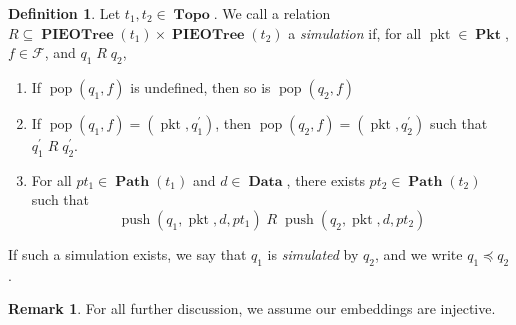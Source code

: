 \documentclass{amsart}
\DeclareMathOperator{\pkt}{\mathrm{pkt}}
\DeclareMathOperator{\push}{\mathrm{push}}
\DeclareMathOperator{\pop}{\mathrm{pop}}
\DeclareMathOperator{\Pkt}{\mathbf{Pkt}}
\DeclareMathOperator{\Data}{\mathbf{Data}}
\DeclareMathOperator{\Topo}{\mathbf{Topo}}
\DeclareMathOperator{\Path}{\mathbf{Path}}
\DeclareMathOperator{\PIEOTree}{\mathbf{PIEOTree}}
\theoremstyle{definition}
\newtheorem{dfn}[thm]{Definition}
\newtheorem{rem}[thm]{Remark}
\begin{document}
\begin{dfn}
    \label{dfn:sim}
    Let $t_1, t_2 \in \Topo$. 
    We call a relation $R \subseteq \PIEOTree(t_1) \times \PIEOTree(t_2)$ a \emph{simulation} if, 
    for all $\pkt \in \Pkt$, $f \in \mathcal F$, and $q_1 \; R \; q_2$,
    \begin{enumerate}
        \item If $\pop(q_1, f)$ is undefined, then so is $\pop(q_2, f)$
        \item If $\pop(q_1, f) = (\pkt, q_1^\prime)$, then $\pop(q_2, f) = (\pkt, q_2^\prime)$ such that $q_1^\prime \; R \; q_2^\prime$.
        \item For all $pt_1 \in \Path(t_1)$ and $d \in \Data$, there exists $pt_2 \in \Path(t_2)$ such that
            $$\push(q_1, \pkt, d, pt_1) \; R \; \push(q_2, \pkt, d, pt_2)$$
    \end{enumerate}
    If such a simulation exists, we say that $q_1$ is \emph{simulated} by $q_2$, and we write $q_1 \preccurlyeq q_2$.
\end{dfn}

\begin{rem}
    For all further discussion, we assume our embeddings are injective.
\end{rem}
\end{document}
